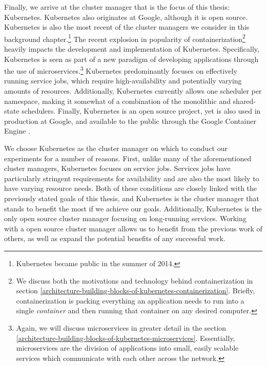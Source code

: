 Finally, we arrive at the cluster manager that is the focus of this thesis:
Kubernetes. Kubernetes also originates at Google, although it is open source.
Kubernetes is also the most
recent of the cluster managers we consider in this background chapter.\footnote{Kubernetes
became public in the summer of 2014.} The recent
explosion in popularity of containerization\footnote{We discuss both the motivations and
technology behind containerization in section
\ref{architecture-building-blocks-of-kubernetes-containerization}. Briefly, containerization is
packing everything an application needs to run into a single \textit{container}
and then running that container on any desired computer.}
heavily impacts the development and implementation of Kubernetes. Specifically,
Kubernetes is seen as part of a new paradigm of developing applications
through the use of microservices.\footnote{Again, we will
discuss microservices in greater detail
in the section \ref{architecture-building-blocks-of-kubernetes-microservices}.
Essentially, microservices are the division of applications
into small, easily scalable services which communicate with each other across
the network.} Kubernetes predominantly focuses on effectively running service
jobs, which require high-availability and potentially varying amounts of resources.
Additionally, Kubernetes currently allows one scheduler per namespace, making it
somewhat of a combination of the monolithic and shared-state schedulers.
Finally, Kubernetes is an open source project, yet is also used in production at
Google, and available to the public through the Google Container
Engine \cite{google-container-engine}.

We choose Kubernetes as the cluster manager on which to conduct our experiments
for a number of reasons. First, unlike many of the aforementioned cluster
managers, Kubernetes focuses on service jobs. Services jobs
have particularly stringent requirements for availability and are also the most
likely to have varying resource needs. Both of these conditions are closely linked
with the previously stated goals of this thesis, and Kubernetes is the cluster
manager that stands to benefit the most if we achieve our goals. Additionally,
Kubernetes is the only open source cluster manager focusing on long-running
services. Working with a open source cluster manager allows us to benefit from
the previous work of others, as well as expand the potential benefits of any
successful work.
